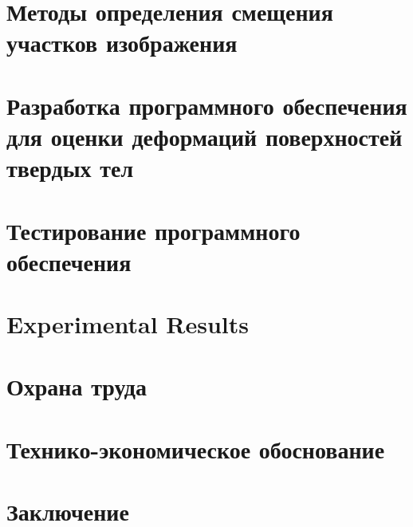 




\newpage
{}
\renewcommand\contentsname{\hfill Содержание \hfill}
\tableofcontents

\section{Методы определения смещения участков изображения}

\section{Разработка программного обеспечения для оценки деформаций поверхностей твердых тел}

\newpage
\section{Тестирование программного обеспечения}

\section{Experimental Results}

\section{Охрана труда}

\section{Технико-экономическое обоснование}

\section{Заключение}

\newpage
\renewcommand{\refname}{Список использованных источников}


